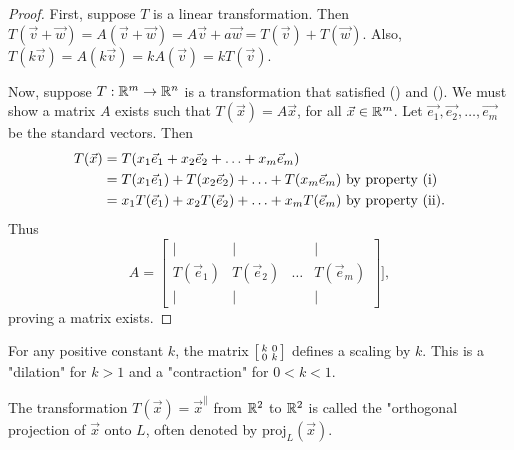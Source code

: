 \documentclass[a4paper,8pt]{article}
\begin{document}
\begin{outline}
    \begin{proof}
      \forward
        First, suppose \(T\) is a linear transformation. Then \(T(\vec{v} + \vec{w}) = A(\vec{v} + \vec{w})
        = A\vec{v} + a\vec{w} = T(\vec{v}) + T(\vec{w})\). Also, \(T(k\vec{v}) = A(k\vec{v}) = kA(\vec{v})
        = kT(\vec{v})\).

      \backward
        Now, suppose \(T: \mathbb{R}^m \rightarrow \mathbb{R}^n\) is a transformation that satisfied
        () and (). We must show a matrix \(A\) exists such that
        \(T(\vec{x}) = A\vec{x}\), for all \(\vec{x} \in \mathbb{R}^m\). Let \(\vec{e_1}, \vec{e_2},
        \ldots, \vec{e_m}\) be the standard vectors. Then
        \begin{align*}
          T(\vec{x}) &= T(x_1\vec{e}_1 + x_2\vec{e}_2 + \ldots + x_m\vec{e}_m)\\
                     &= T(x_1\vec{e}_1) + T(x_2\vec{e}_2) + \ldots + T(x_m\vec{e}_m)
                        \text{ by property (\romannumeral 1)}\\
                     &= x_1T(\vec{e}_1) + x_2T(\vec{e}_2) + \ldots + x_mT(\vec{e}_m)
                        \text{ by property (\romannumeral 2).}
        \end{align*}
        Thus
        \[ A = \begin{bmatrix}
          \vert        & \vert        &        & \vert       \\
          T(\vec{e}_1) & T(\vec{e}_2) & \ldots & T(\vec{e}_m)\\
          \vert        & \vert        &        & \vert       \end{bmatrix}],
        \] proving a matrix exists.
    \end{proof}



    For any positive constant \(k\), the matrix \(\begin{bsmallmatrix} k&0\\ 0&k \end{bsmallmatrix}\) defines
    a scaling by \(k\). This is a "dilation" for \(k > 1\) and a "contraction" for \(0 < k < 1\).

    The transformation \(T(\vec{x}) = \vec{x}^{\parallel}\) from \(\mathbb{R}^2\) to \(\mathbb{R}^2\)
    is called the "orthogonal projection of \(\vec{x}\) onto \(L\), often denoted by \(\text{proj}_{L}(\vec{x})\).


\end{outline}
\end{document}
